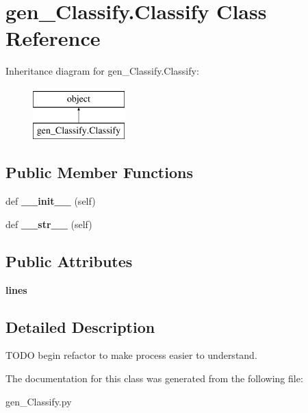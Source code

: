 \hypertarget{classgen___classify_1_1_classify}{}\section{gen\+\_\+\+Classify.\+Classify Class Reference}
\label{classgen___classify_1_1_classify}
Inheritance diagram for gen\+\_\+\+Classify.\+Classify\+:\begin{figure}[H]
\begin{center}
\leavevmode
\includegraphics[height=2.000000cm]{classgen___classify_1_1_classify}
\end{center}
\end{figure}
\subsection*{Public Member Functions}
\begin{DoxyCompactItemize}
\item 
\hypertarget{classgen___classify_1_1_classify_ad0f05ddbb1731e1845793ae678646a50}{}def {\bfseries \+\_\+\+\_\+init\+\_\+\+\_\+} (self)\label{classgen___classify_1_1_classify_ad0f05ddbb1731e1845793ae678646a50}

\item 
\hypertarget{classgen___classify_1_1_classify_af0e0428cea9ceb2c2e46f2123da15a9a}{}def {\bfseries \+\_\+\+\_\+str\+\_\+\+\_\+} (self)\label{classgen___classify_1_1_classify_af0e0428cea9ceb2c2e46f2123da15a9a}

\end{DoxyCompactItemize}
\subsection*{Public Attributes}
\begin{DoxyCompactItemize}
\item 
\hypertarget{classgen___classify_1_1_classify_aa538cbd7ca3cf4f527afada000664fbd}{}{\bfseries lines}\label{classgen___classify_1_1_classify_aa538cbd7ca3cf4f527afada000664fbd}

\end{DoxyCompactItemize}


\subsection{Detailed Description}
\begin{DoxyVerb}TODO begin refactor to make process easier to understand.
\end{DoxyVerb}
 

The documentation for this class was generated from the following file\+:\begin{DoxyCompactItemize}
\item 
gen\+\_\+\+Classify.\+py\end{DoxyCompactItemize}
